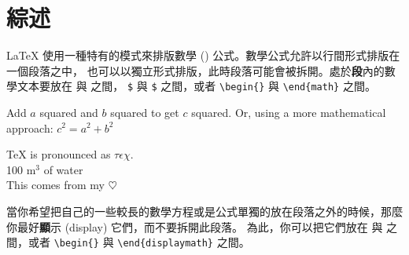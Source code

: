 \section{綜述}
\LaTeX{} 使用一種特有的模式來排版數學 () 公式。數學公式允許以行間形式排版在一個段落之中，
也可以以獨立形式排版，此時段落可能會被拆開。處於{\textbf
段內}的數學文本要放在 \ci{(} 與 \ci{)} 之間，
\texttt{\$} 與 \texttt{\$} 之間，或者 \verb|\begin{|\verb|}| 與 \verb|\end{math}| 之間。

\begin{example}
Add $a$ squared and $b$ squared
to get $c$ squared. Or, using
a more mathematical approach:
$c^{2}=a^{2}+b^{2}$
\end{example}
\begin{example}
\TeX{} is pronounced as
\(\tau\epsilon\chi\).\\[6pt]
100 m$^{3}$ of water\\[6pt]
This comes from my
\begin{math}\heartsuit\end{math}
\end{example}


當你希望把自己的一些較長的數學方程或是公式單獨的放在段落之外的時候，那麼你最好{\textbf
顯示} (display) 它們，而不要拆開此段落。
為此，你可以把它們放在 \ci{[} 與 \ci{]} 之間，或者 \verb|\begin{|\verb|}| 與 \verb|\end{displaymath}| 之間。

